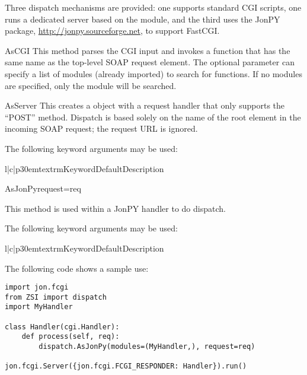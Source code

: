 Three dispatch mechanisms are provided: one supports standard CGI
scripts, one runs a dedicated server based on the
 module, and the third uses the JonPY package,
\url{http://jonpy.sourceforge.net}, to support FastCGI.

\begin{methoddesc}{AsCGI}{}
This method parses the CGI input and invokes a function that has the
same name as the top-level SOAP request element.
The optional  parameter can specify a list of modules
(already imported) to search for functions.
If no modules are specified, only the  module will be searched.
\end{methoddesc}

\begin{methoddesc}{AsServer}{}
This creates a  object with a request handler that only
supports the ``POST'' method.
Dispatch is based solely on the name of the root element in the
incoming SOAP request;
the request URL is ignored.

The following keyword arguments may be used:

\begin{tableiii}{l|c|p{30em}}{textrm}{Keyword}{Default}{Description}
\end{tableiii}

\end{methoddesc}

\begin{methoddesc}{AsJonPy}{request=req}

This method is used within a JonPY handler to do dispatch.

The following keyword arguments may be used:

\begin{tableiii}{l|c|p{30em}}{textrm}{Keyword}{Default}{Description}
\end{tableiii}

The following code shows a sample use:

\begin{verbatim}
import jon.fcgi
from ZSI import dispatch
import MyHandler

class Handler(cgi.Handler):
    def process(self, req):
        dispatch.AsJonPy(modules=(MyHandler,), request=req)

jon.fcgi.Server({jon.fcgi.FCGI_RESPONDER: Handler}).run() 
\end{verbatim}

\end{methoddesc}

